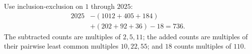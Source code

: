 Use inclusion-exclusion on $1$ through $2025$:
\[\begin{aligned}2025&-(1012+405+184)\\&+(202+92+36)-18=\boxed{736}.\end{aligned}\]
The subtracted counts are multiples of $2,5,11$; the added counts are multiples of their pairwise least common multiples $10,22,55$; and $18$ counts multiples of $110$.
